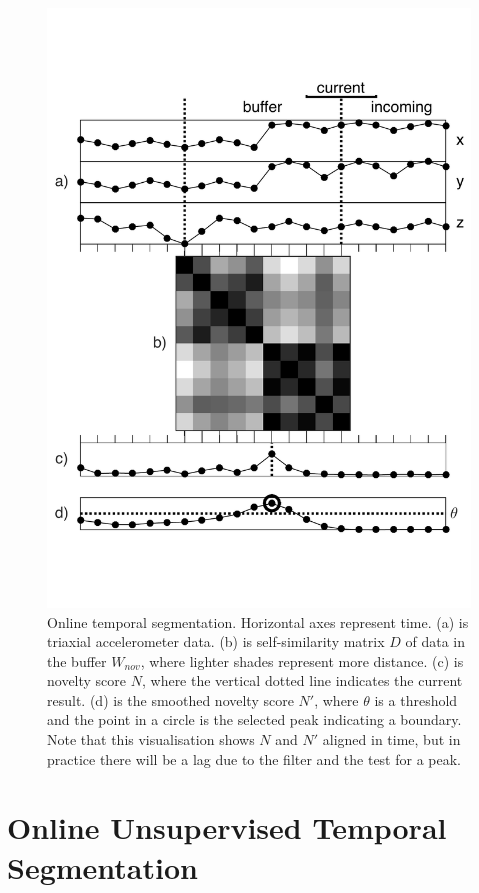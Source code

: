 \documentclass{nime-alternate_MANUSCRIPT} %
\begin{document}
\begin{figure}[t!]
	\centering
		\includegraphics[trim={0.3cm 3.5cm 0.3cm 3.5cm}, clip=true, width=0.9\columnwidth]{fig_1_LO}
	\caption{Online temporal segmentation. Horizontal axes represent time. (a) is triaxial accelerometer data. (b) is self-similarity matrix $D$ of data in the buffer  $W_{nov}$, where lighter shades represent more distance. (c) is novelty score $N$, where the vertical dotted line indicates the current result. (d) is the smoothed novelty score $N'$, where $\theta$ is a threshold and the point in a circle is the selected peak indicating a  boundary. Note that this visualisation shows $N$ and $N'$ aligned in time, but in practice there will be a lag due to the filter and the test for a peak.}
	\label{fig_1}
\end{figure}

\section{Online Unsupervised Temporal Segmentation}\label{OUTS}
\end{document}
